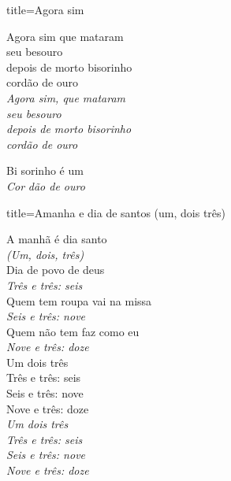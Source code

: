 \documentclass[fontsize=14pt, twoside]{scrreprt}
\begin{document}
\begin{multicols*}{2}
\begin{song}{title={Agora sim}}

\begin{verse*}
Agora sim que mataram\\
seu besouro\\
depois de morto bisorinho\\
cordão de ouro\\
\textit{Agora sim, que mataram}\\
\textit{seu besouro}\\
\textit{depois de morto bisorinho}\\
\textit{cordão de ouro}\\
\end{verse*}

\begin{verse*}
Bi sorinho é um\\
\textit{Cor} \textit{dão de ouro}\\
\end{verse*}

\end{song}

\begin{song}{title={Amanha e dia de santos (um, dois três)}}

    \begin{verse*}
        A manhã é dia santo\\
         \textit{(Um, dois, três)}\\
        Dia de povo de deus\\
\textit{Três e três: seis}\\
Quem tem roupa vai na missa\\
\textit{Seis e três: nove}\\
Quem não tem faz como eu\\
\textit{Nove e três: doze}\\

Um dois três\\
Três e três: seis\\
Seis e três: nove\\
Nove e três: doze\\
\textit{Um dois três}\\
\textit{Três e três: seis}\\
\textit{Seis e três: nove}\\
\textit{Nove e três: doze}\\


\end{verse*}
\end{song}


\end{multicols*}
\end{document}

